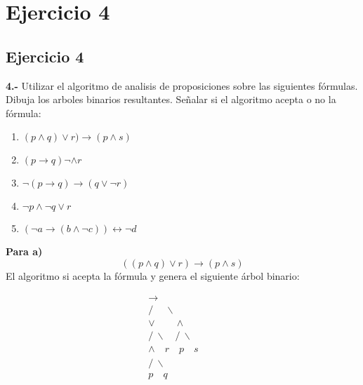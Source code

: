 \chapter*{Ejercicio 4}
\section*{Ejercicio 4}

\textbf{4.-} Utilizar el algoritmo de analisis de proposiciones sobre las siguientes fórmulas. Dibuja los arboles binarios resultantes. Señalar si el algoritmo acepta o no la fórmula: \newline 
\begin{center}
\begin{enumerate}
\renewcommand{\theenumi}{\alph{enumi}} %
    \item $(p \land q)\lor r) \rightarrow ( p \land s)$
    \item $(p \rightarrow q) \neg \land r$
    \item $ \neg (p \rightarrow q) \rightarrow (q \lor \neg r)$
    \item $\neg p \land \neg q \lor r$
    \item $(\neg a \rightarrow (b \land \neg c)) \leftrightarrow \neg d $
\end{enumerate}
\end{center}


\textbf{Para a)}
\[
((p \land q)\lor r) \rightarrow ( p \land s)
\]  \newline
El algoritmo si acepta la fórmula y genera el siguiente árbol binario: \newline

\begin{center}
\[
\begin{array}{c}
\rightarrow \\
/ \quad \ \backslash \\
\lor \quad  \quad  \land \\
/ \ \backslash \quad / \ \backslash \\
\land \quad r \quad p \quad s \\
/ \ \backslash \quad \quad \quad \quad \quad\\
p \quad q \quad \quad \quad \quad \quad  \\
\end{array}
\]
\end{center}\\


